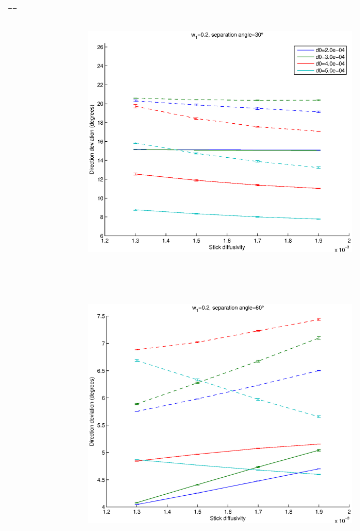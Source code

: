 \documentclass{article}
\begin{document}
\begin{figure}[H]
  \begin{adjustwidth}{-\oddsidemargin}{-\rightmargin}
    \begin{subfigure}{0.8\paperwidth}
      \begin{subfigure}{0.3\textwidth}
        \centering
        \includegraphics[width=\textwidth]{figures/synth_bas_weights_diffus__snr=20__w1=2__angle=30.eps}
      \end{subfigure}
      ~
      \begin{subfigure}{0.3\textwidth}
        \centering
        \includegraphics[width=\textwidth]{figures/synth_bas_weights_diffus__snr=20__w1=2__angle=60.eps}

\end{subfigure}
\end{subfigure}
\end{adjustwidth}
\end{figure}
\end{document}
